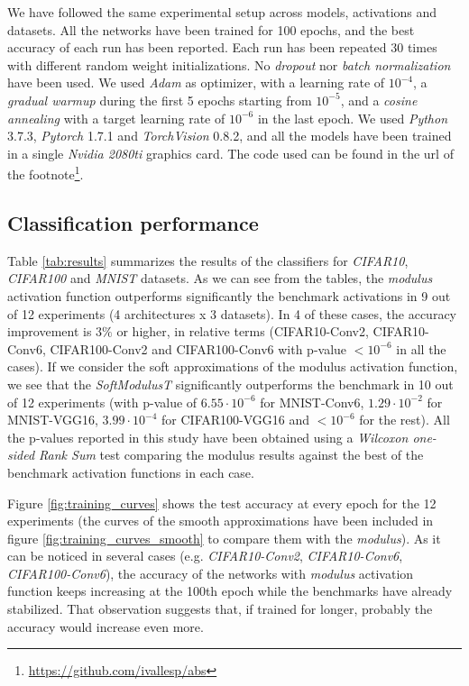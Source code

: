 \documentclass[authoryear]{elsarticle}
\begin{document}
We have followed the same experimental setup across models, activations and datasets. All the networks have been trained for 100 epochs, and the best accuracy of each run has been reported. Each run has been repeated 30 times with different random weight initializations. No \textit{dropout} \citep{Srivastava2014} nor \textit{batch normalization} \citep{Ioffe2015} have been used. We used \textit{Adam} \citep{Kingma14} as optimizer, with a learning rate of $10^{-4}$, a \textit{gradual warmup} \citep{gotmare2018} during the first 5 epochs starting from $10^{-5}$, and a \textit{cosine annealing} \citep{loshchilov2017} with a target learning rate of $10^{-6}$ in the last epoch. We used \textit{Python} 3.7.3, \textit{Pytorch} 1.7.1 and  \textit{TorchVision} 0.8.2, and all the models have been trained in a single \textit{Nvidia 2080ti} graphics card. The code used can be found in the url of the footnote\footnote{\url{https://github.com/ivallesp/abs}}. 


\subsection{Classification performance}
Table \ref{tab:results} summarizes the results of the classifiers for \textit{CIFAR10}, \textit{CIFAR100} and \textit{MNIST} datasets. As we can see from the tables, the \textit{modulus} activation function outperforms significantly the benchmark activations in 9 out of 12 experiments (4 architectures x 3 datasets). In 4 of these cases, the accuracy improvement is $3\%$ or higher, in relative terms (CIFAR10-Conv2, CIFAR10-Conv6, CIFAR100-Conv2 and CIFAR100-Conv6 with p-value  $<10^{-6}$ in all the cases). If we consider the soft approximations of the modulus activation function, we see that the \textit{SoftModulusT} significantly outperforms the benchmark in 10 out of 12 experiments (with p-value of $6.55 \cdot 10^{-6}$ for MNIST-Conv6, $1.29 \cdot 10^{-2}$ for MNIST-VGG16, $3.99 \cdot 10^{-4}$ for CIFAR100-VGG16 and $<10^{-6}$ for the rest). All the p-values reported in this study have been obtained using a \textit{Wilcoxon one-sided Rank Sum} test comparing the modulus results against the best of the benchmark activation functions in each case. 

Figure \ref{fig:training_curves} shows the test accuracy at every epoch for the 12 experiments (the curves of the smooth approximations have been included in figure \ref{fig:training_curves_smooth} to compare them with the \textit{modulus}). As it can be noticed in several cases (e.g. \textit{CIFAR10-Conv2}, \textit{CIFAR10-Conv6}, \textit{CIFAR100-Conv6}), the accuracy of the networks with \textit{modulus} activation function keeps increasing at the 100th epoch while the benchmarks have already stabilized. That observation suggests that, if trained for longer, probably the accuracy would increase even more. 
\end{document}
